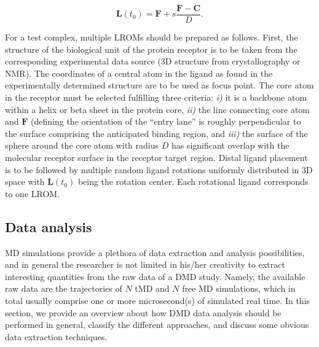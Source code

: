\begin{equation}
\bm{L}(t_0) = \bm{F} + s \frac{\bm{F}-\bm{C}}{D}.
\end{equation}

For a test complex, multiple LROMs should be prepared as follows. First, the
structure of the biological unit of the protein receptor is to be taken from the
corresponding experimental data source (3D structure from crystallography or
NMR). The coordinates of a central atom in the ligand as found in the
experimentally determined structure are to be used as focus point. The core atom
in the receptor must be selected fulfilling three criteria: \textit{i)} it is a
backbone atom within a helix or beta sheet in the protein core, \textit{ii)} the
line connecting core atom and $\bm{F}$ (defining the orientation of the ``entry
lane'' is roughly perpendicular to the surface comprising the anticipated
binding region, and \textit{iii)} the surface of the sphere around the core atom
with radius $D$ has significant overlap with the molecular receptor surface in
the receptor target region. Distal ligand placement is to be followed by
multiple random ligand rotations uniformly distributed in 3D space with
$\bm{L}(t_0)$ being the rotation center. Each rotational ligand corresponds to
one LROM.

\subsection{Data analysis}
\label{dmd:dataanalysis}

MD simulations provide a plethora of data extraction and analysis possibilities,
and in general the researcher is not limited in his/her creativity to extract
interesting quantities from the raw data of a DMD study. Namely, the available
raw data are the trajectories of $N$ tMD and $N$ free MD simulations, which in
total usually comprise one or more microsecond(s) of simulated real time. In
this section, we provide an overview about how DMD data analysis should be
performed in general, classify the different approaches, and discuss some
obvious data extraction techniques.

